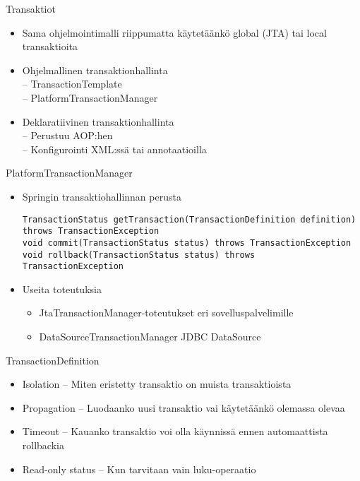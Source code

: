 \documentclass[hyperref={pdfauthor=\AUTHOR},14pt]{beamer}
\author{\AUTHOR}
\title[\TITLE]{\TITLE}
\date{\DATE}
\begin{document}
\begin{frame}[plain]
\titlepage
\end{frame}

\begin{frame}[t, fragile]{Transaktiot}
\begin{itemize}
\item Sama ohjelmointimalli riippumatta käytetäänkö global (JTA) tai local transaktioita
\item Ohjelmallinen transaktionhallinta \\
-- TransactionTemplate \\
-- PlatformTransactionManager
\item Deklaratiivinen transaktionhallinta\\
-- Perustuu AOP:hen\\
-- Konfigurointi XML:ssä tai annotaatioilla
\end{itemize}
\end{frame}

\begin{frame}[t, fragile]{PlatformTransactionManager}
\begin{itemize}
\item Springin transaktiohallinnan perusta 

\lstset{language=Java,style=Java}
\begin{lstlisting}
TransactionStatus getTransaction(TransactionDefinition definition) throws TransactionException
void commit(TransactionStatus status) throws TransactionException
void rollback(TransactionStatus status) throws  TransactionException
\end{lstlisting}
\item Useita toteutuksia
\begin{itemize}
\item JtaTransactionManager-toteutukset eri sovelluspalvelimille
\item DataSourceTransactionManager JDBC DataSource
\end{itemize}
\end{itemize}
\end{frame}

\begin{frame}[t, fragile]{TransactionDefinition}
\begin{itemize}
\item Isolation -- Miten eristetty transaktio on muista transaktioista
\item  Propagation -- Luodaanko uusi transaktio vai käytetäänkö olemassa olevaa
\item Timeout -- Kauanko transaktio voi olla käynnissä ennen automaattista rollbackia
\item Read-only status -- Kun tarvitaan vain luku-operaatio
\end{itemize}
\end{frame}
\end{document}
